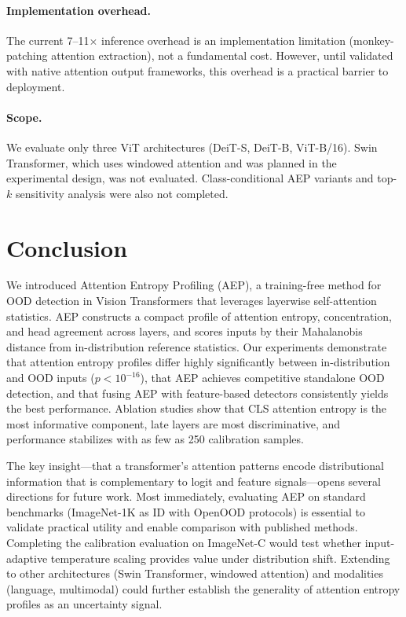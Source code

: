\documentclass{article}
\newcommand{\AEP}{\textsc{AEP}}
\begin{document}
\paragraph{Implementation overhead.}
The current 7--11$\times$ inference overhead is an implementation limitation (monkey-patching attention extraction), not a fundamental cost. However, until validated with native attention output frameworks, this overhead is a practical barrier to deployment.

\paragraph{Scope.}
We evaluate only three ViT architectures (DeiT-S, DeiT-B, ViT-B/16). Swin Transformer, which uses windowed attention and was planned in the experimental design, was not evaluated. Class-conditional AEP variants and top-$k$ sensitivity analysis were also not completed.

\section{Conclusion}
\label{sec:conclusion}

We introduced Attention Entropy Profiling (\AEP{}), a training-free method for OOD detection in Vision Transformers that leverages layerwise self-attention statistics. \AEP{} constructs a compact profile of attention entropy, concentration, and head agreement across layers, and scores inputs by their Mahalanobis distance from in-distribution reference statistics. Our experiments demonstrate that attention entropy profiles differ highly significantly between in-distribution and OOD inputs ($p < 10^{-16}$), that \AEP{} achieves competitive standalone OOD detection, and that fusing \AEP{} with feature-based detectors consistently yields the best performance. Ablation studies show that CLS attention entropy is the most informative component, late layers are most discriminative, and performance stabilizes with as few as 250 calibration samples.

The key insight---that a transformer's attention patterns encode distributional information that is complementary to logit and feature signals---opens several directions for future work. Most immediately, evaluating \AEP{} on standard benchmarks (ImageNet-1K as ID with OpenOOD protocols) is essential to validate practical utility and enable comparison with published methods. Completing the calibration evaluation on ImageNet-C would test whether input-adaptive temperature scaling provides value under distribution shift. Extending to other architectures (Swin Transformer, windowed attention) and modalities (language, multimodal) could further establish the generality of attention entropy profiles as an uncertainty signal.
\end{document}
